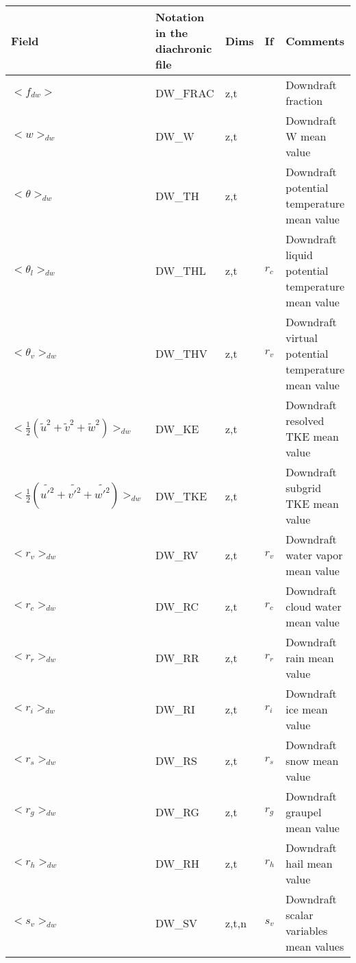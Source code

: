 \begingroup
\renewcommand\arraystretch{1.5}
\begin{longtable}[c]{|p{}|p{}|p{}|p{}|p{}|}
\hline
Field & Notation in the diachronic file & Dims & If  & Comments \\
\hline \hline
\endhead
$<f_{dw}>$                                    & DW\_FRAC  & z,t   &       & Downdraft fraction \\\hline
$<w>_{dw}$                                    & DW\_W     & z,t   &       & Downdraft W mean value \\\hline
$<\theta>_{dw}$                               & DW\_TH    & z,t   &       & Downdraft potential temperature mean value \\\hline
$<\theta_l>_{dw}$                             & DW\_THL   & z,t   & $r_c$ & Downdraft liquid potential temperature mean value \\\hline
$<\theta_v>_{dw}$                             & DW\_THV   & z,t   & $r_v$ & Downdraft virtual potential temperature mean value \\\hline
$<\frac{1}{2}(\tilde{u}^2+\tilde{v}^2+\tilde{w}^2)>_{dw}$ & DW\_KE & z,t & & Downdraft resolved TKE mean value \\\hline
$<\frac{1}{2}(\tilde{u'^2}+\tilde{v'^2}+\tilde{w'^2})>_{dw}$ & DW\_TKE & z,t & & Downdraft subgrid TKE mean value \\\hline
$<r_v>_{dw}$                                  & DW\_RV    & z,t   & $r_v$ & Downdraft water vapor mean value \\\hline
$<r_c>_{dw}$                                  & DW\_RC    & z,t   & $r_c$ & Downdraft cloud water mean value \\\hline
$<r_r>_{dw}$                                  & DW\_RR    & z,t   & $r_r$ & Downdraft rain mean value \\\hline
$<r_i>_{dw}$                                  & DW\_RI    & z,t   & $r_i$ & Downdraft ice mean value \\\hline
$<r_s>_{dw}$                                  & DW\_RS    & z,t   & $r_s$ & Downdraft snow mean value \\\hline
$<r_g>_{dw}$                                  & DW\_RG    & z,t   & $r_g$ & Downdraft graupel mean value \\\hline
$<r_h>_{dw}$                                  & DW\_RH    & z,t   & $r_h$ & Downdraft hail mean value \\\hline
$<s_v>_{dw}$                                  & DW\_SV    & z,t,n & $s_v$ & Downdraft scalar variables mean values \\\hline

\end{longtable}
